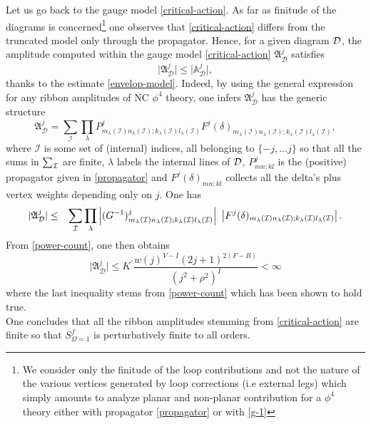\documentclass[11pt]{book}
\theoremstyle{break}
\begin{document}
Let us go back to the gauge model \eqref{critical-action}. As far as finitude of the diagrams is concerned{\footnote{We consider only the finitude of the loop contributions and not the nature of the various vertices generated by loop corrections (i.e external legs) which simply amounts to analyze planar and non-planar contribution for a $\phi^4$ theory either with propagator \eqref{propagator} or with \eqref{g-1}}} one observes that \eqref{critical-action} differs from the truncated model only through the propagator. Hence, for a given diagram ${\cal{D}}$, the amplitude computed within the gauge model \eqref{critical-action} $\mathfrak{A}^j_{\mathcal{D}}$ satisfies 
\begin{equation}
\vert \mathfrak{A}^j_{\mathcal{D}}\vert\le \vert \mathbb{A}^j_{\mathcal{D}}\vert,
\end{equation}
thanks to the estimate \eqref{envelop-model}. Indeed, by using the general expression for any ribbon amplitudes of NC $\phi^4$ theory, one infers $\mathfrak{A}^j_{\mathcal{D}}$ has the generic structure%
%
\begin{equation}
\mathfrak{A}^j_{\mathcal{D}} = \sum_{\mathcal{I}} \prod_\lambda P^j_{m_\lambda(\mathcal{I}) n_\lambda(\mathcal{I});k_\lambda(\mathcal{I}) l_\lambda(\mathcal{I})} F^j(\delta)_{m_\lambda(\mathcal{I}) n_\lambda(\mathcal{I});k_\lambda(\mathcal{I}) l_\lambda(\mathcal{I})},\label{amplit-arb}
\end{equation}
%
where $\mathcal{I}$ is some set of (internal) indices, all belonging to $\{-j,...j\}$ so that all the sums in $\sum_{{\cal{I}}}$ are finite, $\lambda$ labels the internal lines of ${\cal{D}}$, $P^j_{mn;kl}$ is the (positive) propagator given in \eqref{propagator} and $F^j(\delta)_{mn;kl}$ collects all the delta's plus vertex weights depending only on $j$. One has%
%
\begin{eqnarray}
\vert\mathfrak{A}^j_{\mathcal{D}}\vert &\le& \sum_{\mathcal{I}} \prod_\lambda \left|(G^{-1})^j_{m_\lambda(\mathcal{I}) n_\lambda(\mathcal{I}) ; k_\lambda(\mathcal{I}) l_\lambda(\mathcal{I})} \right| \ \left| F^j(\delta)_{m_\lambda({\cal{I}}) n_\lambda({\cal{I}});k_\lambda({\cal{I}}) l_\lambda({\cal{I}})} \right|.
\end{eqnarray}
%
From \eqref{power-count}, one then obtains
\begin{equation}
\vert\mathfrak{A}^j_{\mathcal{D}}\vert \le K^\prime\frac{w(j)^{V-I}(2j+1)^{2(F-B)}}{(j^2+\rho^2)^I}< \infty
\end{equation}
where the last inequality stems from \eqref{power-count} which has been shown to hold true.\\
One concludes that all the ribbon amplitudes stemming from \eqref{critical-action} are finite so that $S^f_{\Omega=1}$ is perturbatively finite to all orders.\par%
\end{document}
